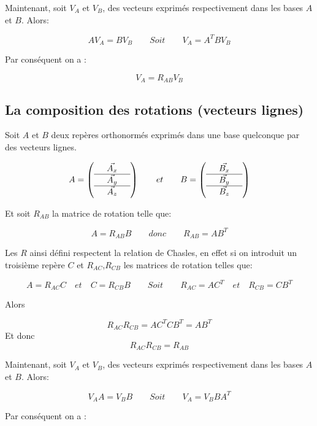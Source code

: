 \documentclass[12pt,a4paper]{article}
\begin{document}
	Maintenant, soit $V_{A}$ et $V_{B}$, des vecteurs exprimés respectivement dans les bases $A$ et $B$. Alors:
	
	\[
	A V_{A} =B V_{B} \quad\quad Soit\quad \quad V_{A} =A^T B V_{B}
	\]
	
	Par conséquent on a :
	
	\[
	\boxed{V_{A} = R_{AB} V_{B}} 
	\]
	
	\newpage
	\subsection{La composition des rotations (vecteurs lignes)}
	
	Soit $A$ et $B$ deux repères orthonormés exprimés dans une base quelconque par des vecteurs lignes. 
	
	\[
	A=\left(\begin{array}{ccc}
	&\vec{A_x}&\\
	\hline
	&\vec{A_y}&\\
	\hline
	&\vec{A_z}&\\
	\end{array}
	\right)		
	\qquad 
	et
	\qquad
	B=\left(\begin{array}{ccc}
	&\vec{B_x}&\\
	\hline
	&\vec{B_y}&\\
	\hline
	&\vec{B_z}&\\
	\end{array}
	\right)	
	\]
	
	Et soit $R_{AB}$ la matrice de rotation telle que:
	
	\[
	\boxed{A=R_{AB}B} \quad \quad donc \quad \quad \boxed{R_{AB}=AB^T}
	\]
	
	Les $R$ ainsi défini respectent la relation de Chasles, en effet si on introduit un troisième repère $C$ et $R_{AC}$,$R_{CB}$ les matrices de rotation telles que:
	
	\[
	A=R_{AC}C\quad et \quad C=R_{CB}B  \quad\quad Soit\quad \quad R_{AC}=AC^T \quad et\quad  R_{CB}=CB^T
	\]
	
	Alors 
	
	\[
	R_{AC}R_{CB}=AC^TCB^T = AB^T
	\]
	Et donc 
	\[
	\boxed{R_{AC}R_{CB}=R_{AB}}
	\]
	
	Maintenant, soit $V_{A}$ et $V_{B}$, des vecteurs exprimés respectivement dans les bases $A$ et $B$. Alors:
	
	\[
	V_{A} A  =V_{B} B  \quad\quad Soit\quad \quad V_{A} = V_{B} B A^T 
	\]
	
	Par conséquent on a :
	
\end{document}
